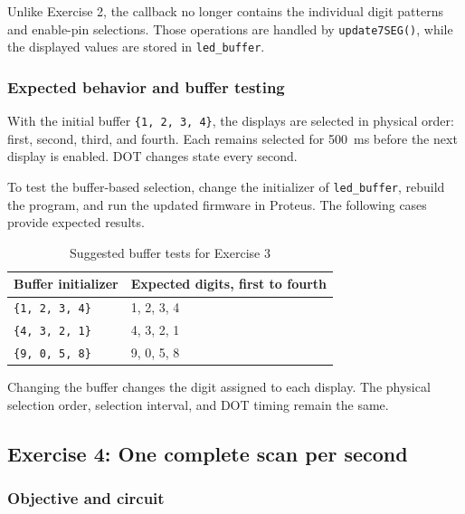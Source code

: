 \documentclass[a4paper]{article}
\begin{document}
Unlike Exercise 2, the callback no longer contains
the individual digit patterns and enable-pin
selections. Those operations are handled by
\texttt{update7SEG()}, while the displayed values
are stored in \texttt{led\_buffer}.

\subsubsection{Expected behavior and buffer testing}

With the initial buffer \texttt{\{1, 2, 3, 4\}},
the displays are selected in physical order:
first, second, third, and fourth. Each remains
selected for 500~ms before the next display is
enabled. DOT changes state every second.

To test the buffer-based selection, change the
initializer of \texttt{led\_buffer}, rebuild the
program, and run the updated firmware in Proteus.
The following cases provide expected results.

\begin{table}[H]
    \centering
    \caption{Suggested buffer tests for Exercise 3}
    \label{tab:ex03-tests}
    \begin{tabular}{ll}
        \toprule
        \textbf{Buffer initializer} &
        \textbf{Expected digits, first to fourth} \\
        \midrule
        \texttt{\{1, 2, 3, 4\}} & 1, 2, 3, 4 \\
        \texttt{\{4, 3, 2, 1\}} & 4, 3, 2, 1 \\
        \texttt{\{9, 0, 5, 8\}} & 9, 0, 5, 8 \\
        \bottomrule
    \end{tabular}
\end{table}

Changing the buffer changes the digit assigned to
each display. The physical selection order,
selection interval, and DOT timing remain the same.
\subsection{Exercise 4: One complete scan per second}

\subsubsection{Objective and circuit}
\end{document}
